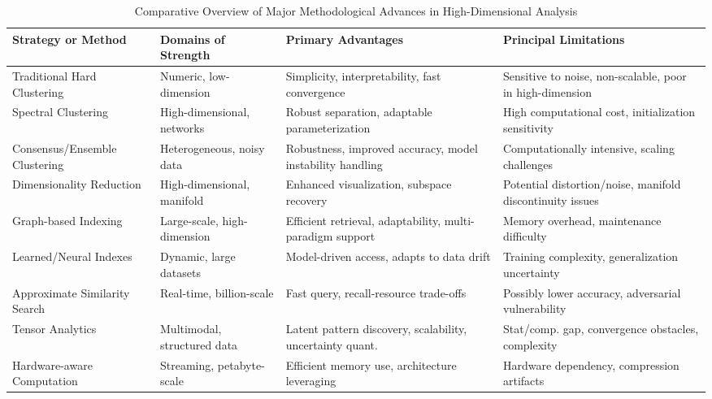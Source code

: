 \begin{table*}[htbp]
\centering
\caption{Comparative Overview of Major Methodological Advances in High-Dimensional Analysis}
\label{tab:method_comparison}
\begin{adjustbox}{max width=\textwidth}
\begin{tabular}{llll}
\toprule
\textbf{Strategy or Method} & \textbf{Domains of Strength} & \textbf{Primary Advantages} & \textbf{Principal Limitations} \\
\midrule
Traditional Hard Clustering    & Numeric, low-dimension      & Simplicity, interpretability, fast convergence             & Sensitive to noise, non-scalable, poor in high-dimension \\
Spectral Clustering           & High-dimensional, networks  & Robust separation, adaptable parameterization              & High computational cost, initialization sensitivity       \\
Consensus/Ensemble Clustering & Heterogeneous, noisy data   & Robustness, improved accuracy, model instability handling  & Computationally intensive, scaling challenges             \\
Dimensionality Reduction      & High-dimensional, manifold  & Enhanced visualization, subspace recovery                  & Potential distortion/noise, manifold discontinuity issues \\
Graph-based Indexing          & Large-scale, high-dimension & Efficient retrieval, adaptability, multi-paradigm support  & Memory overhead, maintenance difficulty                   \\
Learned/Neural Indexes        & Dynamic, large datasets     & Model-driven access, adapts to data drift                  & Training complexity, generalization uncertainty           \\
Approximate Similarity Search & Real-time, billion-scale    & Fast query, recall-resource trade-offs                     & Possibly lower accuracy, adversarial vulnerability        \\
Tensor Analytics              & Multimodal, structured data & Latent pattern discovery, scalability, uncertainty quant.  & Stat/comp. gap, convergence obstacles, complexity         \\
Hardware-aware Computation    & Streaming, petabyte-scale   & Efficient memory use, architecture leveraging              & Hardware dependency, compression artifacts                \\
\bottomrule
\end{tabular}
\end{adjustbox}
\end{table*}

